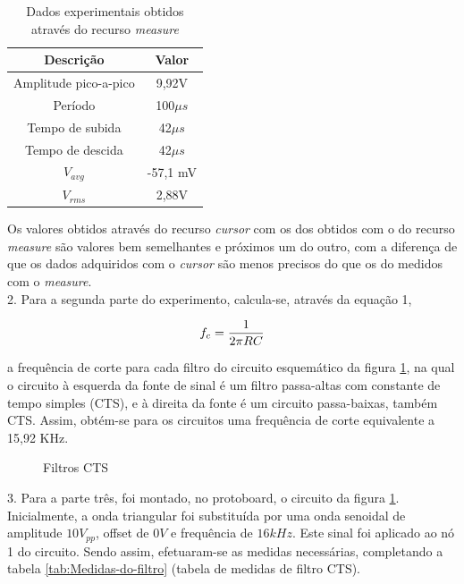 \documentclass[a4paper]{article} %
\begin{document}
\begin{table}[h]
\begin{centering}
\caption{Dados experimentais obtidos através do recurso \textit{measure} \label{tab:measure}}
\begin{tabular}{cc}
\hline 
Descrição & Valor\tabularnewline
\hline
Amplitude pico-a-pico & 9,92V \tabularnewline
Período & 100$\mu s$\tabularnewline
Tempo de subida & 42$\mu s$\tabularnewline
Tempo de descida  & 42$\mu s$\tabularnewline
$V_{avg}$ & -57,1 mV\tabularnewline
$V_{rms}$ & 2,88V \tabularnewline
\hline
\end{tabular}
\par\end{centering}
\end{table}
\newpage
Os valores obtidos através do recurso \textit{cursor} com os dos obtidos com o do recurso \textit{measure} são valores bem semelhantes e próximos um do outro, com a diferença de que os dados adquiridos com o \textit{cursor}  são menos precisos do que os do medidos com o \textit{measure}.\\

2. Para a segunda parte do experimento, calcula-se, através da equação 1,
\vspace{1mm}

\begin{equation}
 f_{c}=\frac{1}{2\pi RC}\\
\end{equation}

\vspace{2mm}


 a frequência de corte para cada filtro do circuito esquemático da figura \ref{tab:circ}, na qual o circuito à esquerda da fonte de sinal é um filtro passa-altas com constante de tempo simples (CTS), e à direita da fonte é um circuito passa-baixas, também CTS. Assim, obtém-se para os circuitos uma frequência de corte equivalente a 15,92 KHz.


\vspace{3mm}
\begin{figure}[h]
\centerline{}
\caption{Filtros CTS \label{tab:circ}}
\end{figure}

\vspace{2mm}


3. Para a parte três, foi montado, no protoboard, o circuito da figura \ref{tab:circ}. Inicialmente, a onda triangular foi substituída por uma onda senoidal de amplitude $10V_{pp}$, offset de $0V$ e frequência de $16kHz$. Este sinal foi aplicado ao nó 1 do circuito. Sendo assim, efetuaram-se as medidas necessárias, completando a tabela \ref{tab:Medidas-do-filtro} (tabela de medidas de filtro CTS).
\end{document}
